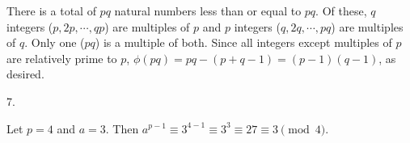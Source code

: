 There is a total of $pq$ natural numbers less than or equal to $pq$.
Of these, $q$ integers ($p, 2p, \cdots, qp$) are multiples of $p$ and
$p$ integers ($q, 2q, \cdots, pq$) are multiples of $q$.
Only one ($pq$) is a multiple of both.
Since all integers except multiples of $p$ are relatively prime to $p$,
$\phi (pq) = pq - (p + q - 1) = (p - 1)(q - 1)$, as desired.
\bigskip
\item{7.}

Let $p = 4$ and $a = 3$.
Then $a^{p - 1} \equiv 3^{4 - 1} \equiv 3^3 \equiv 27 \equiv 3 \pmod 4$.
\bye
